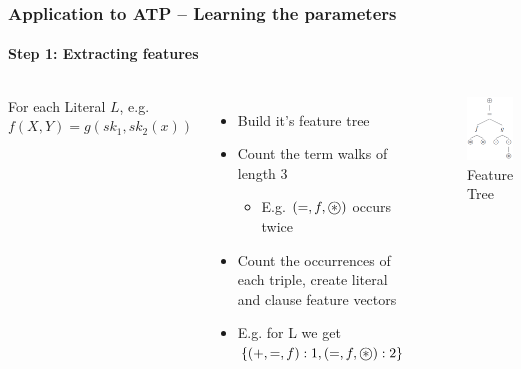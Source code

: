 \documentclass{beamer}
\newcommand\oast{\stackMath\mathbin{\stackinset{c}{0ex}{c}{0ex}{\ast}{\bigcirc}}}
\begin{document}
\begin{frame}
    \frametitle{Application to ATP -- Learning the parameters}
    \framesubtitle{\textbf{Step 1:} Extracting features}
    \begin{columns}
    For each Literal $L$, e.g. $f(X, Y) = g(sk_1, sk_2(x))$ \footnotemark
    \begin{itemize}
        \item Build it's \alert{feature tree}
        \item Count the \alert{term walks} of length 3
            \begin{itemize}
                \item E.g. $(=, f, \oast)$ occurs twice
            \end{itemize}
        \item Count the occurrences of each triple, create literal and clause feature vectors

        \item E.g. for L we get $\{(+, =, f): 1, (=, f, \oast):2\}$ 
    \end{itemize}
    \begin{figure}
    \includegraphics[width=\textwidth]{AST.png}
    \caption{Feature Tree}
    \end{figure}
    \end{columns}


\end{frame}
\end{document}
